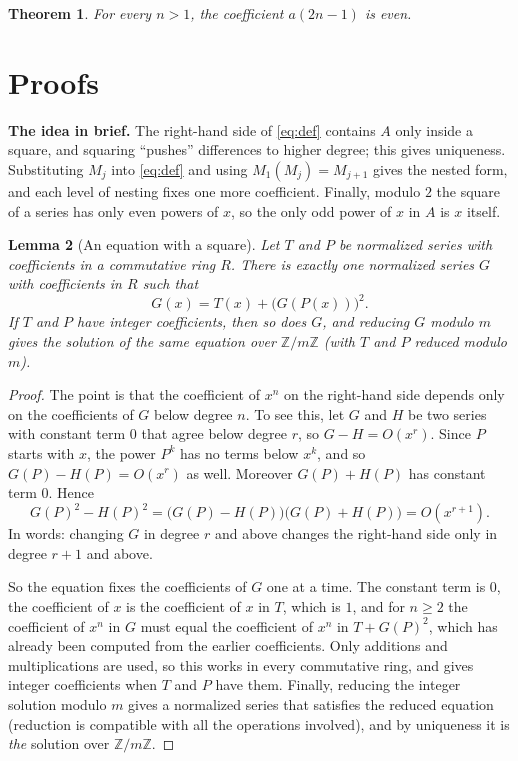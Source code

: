 \documentclass[11pt,a4paper]{article}
\newtheorem{theorem}{Theorem}[section]
\newtheorem{lemma}[theorem]{Lemma}
\theoremstyle{definition}
\theoremstyle{remark}
\newcommand{\Z}{\mathbb{Z}}
\newcommand{\para}[1]{\par\medskip\noindent\textbf{#1}\enspace}
\begin{document}
\begin{theorem}\label{thm:main}
For every $n>1$, the coefficient $a(2n-1)$ is even.
\end{theorem}

\section{Proofs}\label{sec:proofs}

\para{The idea in brief.} The right-hand side of \eqref{eq:def} contains $A$ only inside a square, and squaring
``pushes'' differences to higher degree; this gives uniqueness. Substituting $M_j$ into \eqref{eq:def} and using
$M_1(M_j)=M_{j+1}$ gives the nested form, and each level of nesting fixes one more coefficient. Finally, modulo $2$ the
square of a series has only even powers of $x$, so the only odd power of $x$ in $A$ is $x$ itself.

\begin{lemma}[An equation with a square]\label{lem:square}
Let $T$ and $P$ be normalized series with coefficients in a commutative ring $R$. There is exactly one normalized
series $G$ with coefficients in $R$ such that
\[
G(x)=T(x)+\bigl(G(P(x))\bigr)^2 .
\]
If $T$ and $P$ have integer coefficients, then so does $G$, and reducing $G$ modulo $m$ gives the solution of the same
equation over $\Z/m\Z$ (with $T$ and $P$ reduced modulo $m$).
\end{lemma}

\begin{proof}
The point is that the coefficient of $x^n$ on the right-hand side depends only on the coefficients of $G$ below degree
$n$. To see this, let $G$ and $H$ be two series with constant term $0$ that agree below degree $r$, so $G-H=O(x^r)$.
Since $P$ starts with $x$, the power $P^k$ has no terms below $x^k$, and so $G(P)-H(P)=O(x^r)$ as well. Moreover
$G(P)+H(P)$ has constant term $0$. Hence
\[
G(P)^2-H(P)^2=\bigl(G(P)-H(P)\bigr)\bigl(G(P)+H(P)\bigr)=O(x^{r+1}).
\]
In words: changing $G$ in degree $r$ and above changes the right-hand side only in degree $r+1$ and above.

So the equation fixes the coefficients of $G$ one at a time. The constant term is $0$, the coefficient of $x$ is the
coefficient of $x$ in $T$, which is $1$, and for $n\ge2$ the coefficient of $x^n$ in $G$ must equal the coefficient of
$x^n$ in $T+G(P)^2$, which has already been computed from the earlier coefficients. Only additions and multiplications
are used, so this works in every commutative ring, and gives integer coefficients when $T$ and $P$ have them. Finally,
reducing the integer solution modulo $m$ gives a normalized series that satisfies the reduced equation (reduction is
compatible with all the operations involved), and by uniqueness it is \emph{the} solution over $\Z/m\Z$.
\end{proof}
\end{document}
